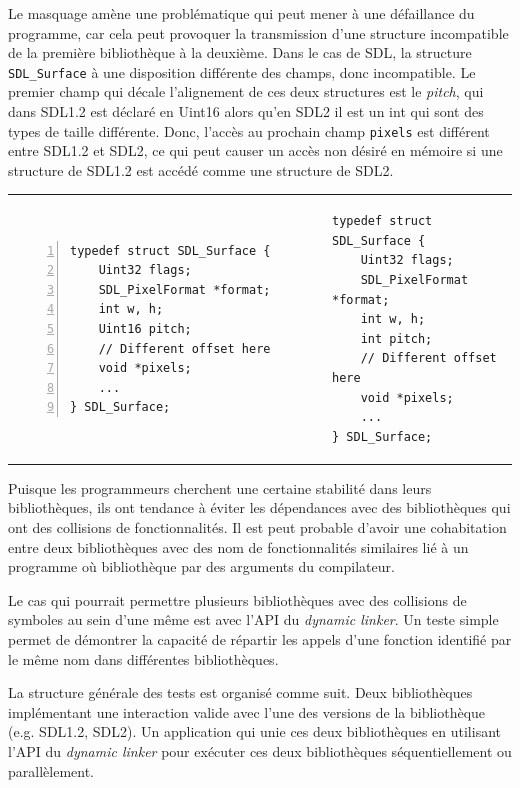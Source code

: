 Le masquage amène une problématique qui peut mener à une défaillance du programme, car cela peut provoquer
la transmission d'une structure incompatible de la première bibliothèque à la deuxième. Dans le cas de SDL, la structure
\verb+SDL_Surface+ à une disposition différente des champs, donc incompatible.
Le premier champ qui décale l'alignement de ces deux structures est le \textit{pitch},
qui dans SDL1.2 est déclaré en Uint16 alors qu'en SDL2 il est un int qui sont des types de
taille différente. Donc, l'accès au prochain champ \texttt{pixels} est différent entre SDL1.2
et SDL2, ce qui peut causer un accès non désiré en mémoire si une structure de SDL1.2 est accédé comme
une structure de SDL2.
\begin{center}
\begin{tabular}{p{18em}p{18em}}
\begin{lstlisting}[frame=single,numbers=left]
typedef struct SDL_Surface {
    Uint32 flags;
    SDL_PixelFormat *format;
    int w, h;
    Uint16 pitch;
    // Different offset here
    void *pixels;
    ...
} SDL_Surface;
\end{lstlisting}&
\begin{lstlisting}[frame=single,numbers=right]
typedef struct SDL_Surface {
    Uint32 flags;
    SDL_PixelFormat *format;
    int w, h;
    int pitch;
    // Different offset here
    void *pixels;
    ...
} SDL_Surface;
\end{lstlisting}\\
\end{tabular}
\end{center}
Puisque les programmeurs cherchent une certaine stabilité dans leurs bibliothèques, ils ont
tendance à éviter les dépendances avec des bibliothèques qui ont des collisions de fonctionnalités.
Il est peut probable d'avoir une cohabitation entre deux bibliothèques avec des nom de fonctionnalités
similaires lié à un programme où bibliothèque par des arguments du compilateur.

Le cas qui pourrait permettre plusieurs bibliothèques avec des collisions de symboles
au sein d'une même est avec l'API du \textit{dynamic linker}. Un teste simple permet
de démontrer la capacité de répartir les appels d'une fonction identifié par le même nom
dans différentes bibliothèques.

La structure générale des tests est organisé comme suit. Deux bibliothèques implémentant
une interaction valide avec l'une des versions de la bibliothèque (e.g. SDL1.2, SDL2).
Un application qui unie ces deux bibliothèques en utilisant l'API du
\textit{dynamic linker} pour exécuter ces deux bibliothèques séquentiellement ou
parallèlement.

